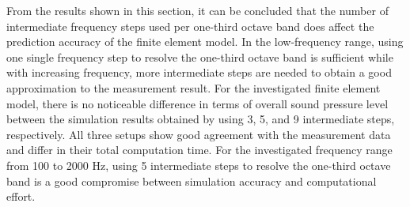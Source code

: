 From the results shown in this section, it can be concluded that the number of intermediate frequency steps used per one-third octave band does affect the prediction accuracy of the finite element model. In the low-frequency range, using one single frequency step to resolve the one-third octave band is sufficient while with increasing frequency, more intermediate steps are needed to obtain a good approximation to the measurement result. For the investigated finite element model, there is no noticeable difference in terms of overall sound pressure level between the simulation results obtained by using 3, 5, and 9 intermediate steps, respectively. All three setups show good agreement with the measurement data and differ in their total computation time. For the investigated frequency range from 100 to 2000 Hz, using 5 intermediate steps to resolve the one-third octave band is a good compromise between simulation accuracy and computational effort. 